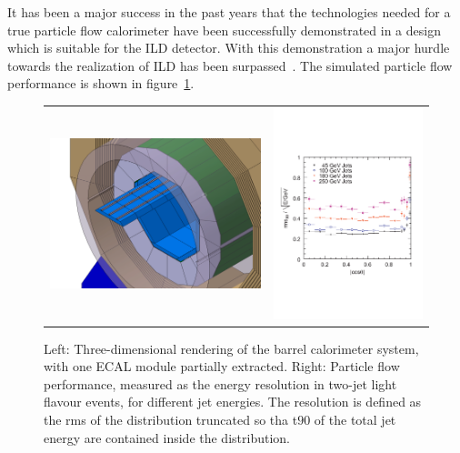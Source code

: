 \documentclass[%
 amsmath,amssymb,
 aps,
]{revtex4-1}
\begin{document}
It has been a major success in the past years that the technologies needed for a true particle flow calorimeter have been successfully demonstrated in a design which is suitable for the ILD detector. With this demonstration a major hurdle towards the realization of ILD has been surpassed~\cite{Sefkow:2015hna}. The simulated particle flow performance is shown in figure~\ref{fig:pflow}.
\begin{figure}[th]
    \centering
    \begin{tabular}{lr}
    \includegraphics[width=0.45\hsize]{figures/ECal_insertion.jpg}&
    \includegraphics[width=0.4\hsize]{figures/pflow.pdf}\\
    \end{tabular}
    \caption{Left: Three-dimensional rendering of the barrel calorimeter system, with one ECAL module partially extracted. Right: Particle flow performance, measured as the energy resolution in two-jet light flavour events, for different jet energies. The resolution is defined as the rms of the distribution truncated so tha t$90$ of the total jet energy are contained inside the distribution.}
    \label{fig:pflow}
\end{figure}
\end{document}
